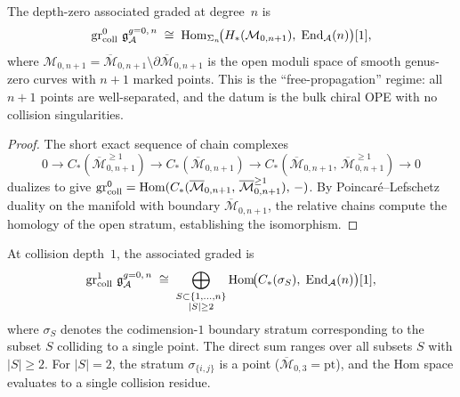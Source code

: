 \begin{proposition}
The depth-zero associated graded at degree~$n$ is
\begin{equation}%
\grcoll^0\,\mathfrak{g}^{g{=}0,\,n}_\cA
\;\cong\;
\Hom_{\Sigma_n}\!\bigl(
 H_*(\mathcal{M}_{0,n+1}),\;
 \End_\cA(n)
\bigr)[1],
\end{equation}
where $\mathcal{M}_{0,n+1} = \overline{\mathcal{M}}_{0,n+1}
\setminus \partial\overline{\mathcal{M}}_{0,n+1}$ is the open
moduli space of smooth genus-zero curves with $n+1$ marked points.
This is the ``free-propagation'' regime: all $n+1$ points are
well-separated, and the datum is the bulk chiral OPE with no
collision singularities.
\end{proposition}

\begin{proof}
The short exact sequence of chain complexes
\[
0 \to C_*(\overline{\mathcal{M}}_{0,n+1}^{\geq 1})
\to C_*(\overline{\mathcal{M}}_{0,n+1})
\to C_*(\overline{\mathcal{M}}_{0,n+1},\,
 \overline{\mathcal{M}}_{0,n+1}^{\geq 1})
\to 0
\]
dualizes to give
$\operatorname{gr}_{\mathrm{coll}}^0 = \operatorname{Hom}(C_*(\overline{\mathcal{M}}_{0,n+1},\,
\overline{\mathcal{M}}_{0,n+1}^{\geq 1}),\,-)$.
By Poincar\'e--Lefschetz duality on the manifold with boundary
$\overline{\mathcal{M}}_{0,n+1}$, the relative chains compute the
homology of the open stratum, establishing the isomorphism.
\end{proof}

\begin{proposition}
At collision depth~$1$, the associated graded is
\begin{equation}%
\grcoll^1\,\mathfrak{g}^{g{=}0,\,n}_\cA
\;\cong\;
\bigoplus_{\substack{S \subset \{1,\dotsc,n\} \\
 |S| \geq 2}}
\Hom\!\bigl(
 C_*(\sigma_S),\;
 \End_\cA(n)
\bigr)[1],
\end{equation}
where $\sigma_S$ denotes the codimension-$1$ boundary stratum
corresponding to the subset $S$ colliding to a single point.
The direct sum ranges over all subsets $S$ with $|S| \geq 2$.
For $|S| = 2$, the stratum $\sigma_{\{i,j\}}$ is a point
\textup{(}$\overline{\mathcal{M}}_{0,3} = \mathrm{pt}$\textup{)},
and the Hom space evaluates to a single collision residue.
\end{proposition}

